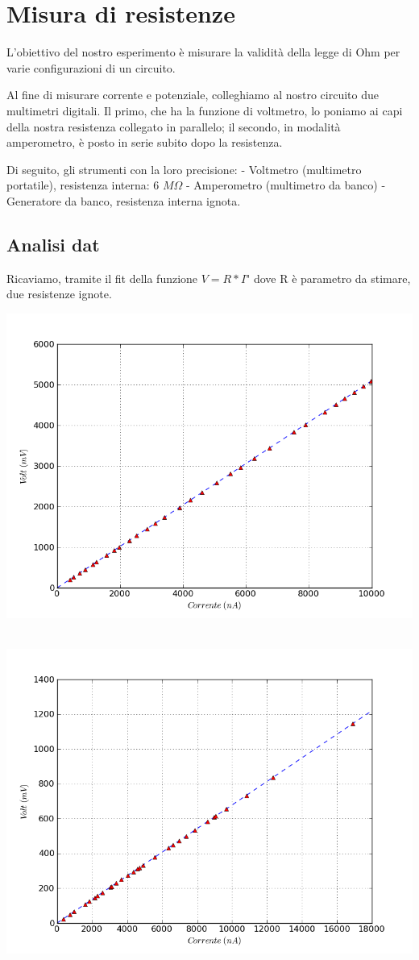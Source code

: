 \chapter{Misura di resistenze}

L'obiettivo del nostro esperimento è misurare la validità della legge di Ohm per varie configurazioni di un circuito. 

Al fine di misurare corrente e potenziale, colleghiamo al nostro circuito due multimetri digitali. Il primo, che ha la funzione di voltmetro, lo poniamo ai capi della nostra resistenza collegato in parallelo; il secondo, in modalità amperometro, è posto in serie subito dopo la resistenza. 

Di seguito, gli strumenti con la loro precisione:
- Voltmetro (multimetro portatile), resistenza interna: 6 $M\Omega$
- Amperometro (multimetro da banco)
- Generatore da banco, resistenza interna ignota.


\section{Analisi dat}

Ricaviamo, tramite  il fit della funzione $V=R*I$" dove R è parametro da stimare, due resistenze ignote.


\includegraphics[scale=0.75]{grafici/C1/res1.png}
\

\includegraphics[scale=0.75]{grafici/C1/res2.png}

